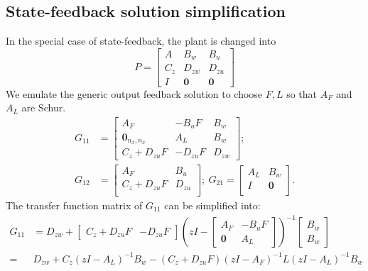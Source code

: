 \subsection{State-feedback solution simplification}
In the special case of state-feedback, the plant is changed into
\begin{equation}
    P = \left[
    \begin{array}{c|cc}
        A & B_w & B_u \\
        \hline
        C_z & D_{zw} & D_{zu}\\
        I & \mathbf{0} & \mathbf{0}
    \end{array}\right]
\end{equation}
We emulate the generic output feedback solution to choose \(F,L\) so that  \(A_F\) and \(A_L\) are Schur. 
\begin{subequations}
\begin{align}
G_{11} &= \left[\begin{array}{cc|c}
    A_F & -B_u F & B_w\\
   \mathbf{0}_{n_x,n_x} & A_L & B_w\\
    \hline
    C_z + D_{zu}F & -D_{zu}F & D_{zw}
\end{array}\right];\\  
G_{12} & = \left[
    \begin{array}{c|c}
        A_F & B_u \\
        \hline
        C_z + D_{zu}F & D_{zu} \\
    \end{array}\right];\ 
G_{21} = \left[
    \begin{array}{c|c}
        A_L & B_w\\
        \hline
        I & \mathbf{0} \\
    \end{array}\right].
\end{align}
\end{subequations}
The transfer function matrix of \(G_{11}\) can be simplified into:
\begin{equation}
\begin{split}
G_{11} & = D_{zw} + 
\begin{bmatrix}
    C_z+D_{zu} F & -D_{zu} F
\end{bmatrix} \left(z I - \begin{bmatrix}
    A_F & -B_u F \\
    \mathbf{0} & A_L
\end{bmatrix}\right)^{-1}
\begin{bmatrix}
    B_w \\
    B_w
\end{bmatrix} \\
= & D_{zw} + C_z (zI-A_L)^{-1} B_w  - (C_z + D_{zu} F) (zI-A_F)^{-1} L (zI-A_L)^{-1} B_w
\end{split} 
\end{equation}
